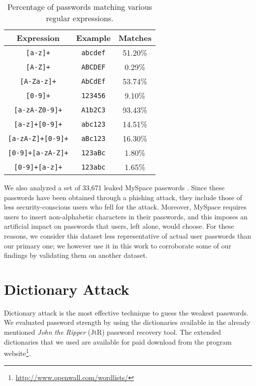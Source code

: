 \documentclass[a4paper,twocolumn]{article}
\providecommand{\tabularnewline}{\\}
\begin{document}
\begin{table}
\begin{centering}
\begin{tabular}{|c|c|c|}
\hline 
Expression & Example & Matches\tabularnewline
\hline
\hline 
\texttt{{[}a-z{]}+} & \texttt{abcdef} & 51.20\%\tabularnewline
\hline 
\texttt{{[}A-Z{]}+} & \texttt{ABCDEF} & 0.29\%\tabularnewline
\hline 
\texttt{{[}A-Za-z{]}+} & \texttt{AbCdEf} & 53.74\%\tabularnewline
\hline 
\texttt{{[}0-9{]}+} & \texttt{123456} & 9.10\%\tabularnewline
\hline 
\texttt{{[}a-zA-Z0-9{]}+} & \texttt{A1b2C3} & 93.43\%\tabularnewline
\hline 
\texttt{{[}a-z{]}+{[}0-9{]}+} & \texttt{abc123} & 14.51\%\tabularnewline
\hline 
\texttt{{[}a-zA-Z{]}+{[}0-9{]}+} & \texttt{aBc123} & 16.30\%\tabularnewline
\hline 
\texttt{{[}0-9{]}+{[}a-zA-Z{]}+} & \texttt{123aBc} & 1.80\%\tabularnewline
\hline 
\texttt{{[}0-9{]}+{[}a-z{]}+} & \texttt{123abc} & 1.65\%\tabularnewline
\hline
\end{tabular}
\par\end{centering}

\caption{\label{tab:Regular-expressions.}Percentage of passwords matching
various regular expressions.}



\end{table}


We also analyzed a set of 33,671 leaked MySpace passwords \cite{Grimes2006MySpace,Porst2007Brief}.
Since these passwords have been obtained through a phishing attack,
they include those of less security-conscious users who fell for the
attack. Moreover, MySpace requires users to insert non-alphabetic
characters in their passwords, and this imposes an artificial impact
on passwords that users, left alone, would choose. For these reasons,
we consider this dataset less representative of actual user passwords
than our primary one; we however use it in this work to corroborate
some of our findings by validating them on another dataset.


\section{Dictionary Attack}

\label{sec:Dictionary-Attack}Dictionary attack is the most effective
technique to guess the weakest passwords. We evaluated password strength
by using the dictionaries available in the already mentioned \emph{John
the Ripper} (JtR) password recovery tool. The extended dictionaries
that we used are available for paid download from the program website\footnote{\url{http://www.openwall.com/wordlists/}}.
\end{document}
